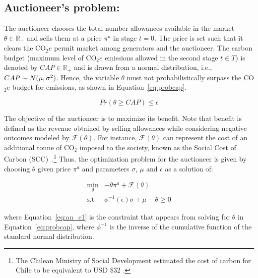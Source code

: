 \documentclass[11pt, letterpaper]{article}
\begin{document}
\subsection{Auctioneer's problem:}\label{sec:auctioneer}
 The auctioneer chooses the total number allowances available in the market $\theta\in \mathbb{R}_+$ and sells them at a price $\pi^a$ in stage $t=0$. The price is set such that it clears the CO$_2e$ permit market among generators and the auctioneer.  The carbon budget (maximum level of CO$_2e$ emissions allowed in the second stage $t\in T$) is denoted by  $CAP\in\mathbb{R}_+$ and is drawn from a normal distribution, i.e., $CAP \thicksim N(\mu, \sigma^2)$. Hence, the variable $\theta$ must not probabilistically surpass the CO$_2e$ budget for emissions, as shown in Equation~\ref{eq:probcap}.
 
\begin{equation}
    Pr(\theta \geq CAP) \leq \epsilon \label{eq:probcap}
\end{equation}

 The objective of the auctioneer is to maximize its benefit. Note that benefit is defined as the revenue obtained by selling allowances while considering negative outcomes modeled by $\mathcal{F}(\theta)$. For instance, $\mathcal{F}(\theta)$ can represent the cost of an additional tonne of CO$_2$ imposed to the society, known as the Social Cost of Carbon (SCC)~\cite{feijoo2014design}.\footnote{The Chilean Ministry of Social Development estimated the cost of carbon for Chile to be equivalent to USD \$32 \cite{ChileSCC}.} Thus, the optimization problem for the auctioneer is given by choosing $\theta$ given price $\pi^a$ and parameters $\sigma$, $\mu$ and $\epsilon$ as a solution of:

\begin{align}
    \min_{\theta} & -\theta \pi^{a}  + \mathcal{F}(\theta)   \label{eq:auc} \\
    \textrm{s.t \ } &  \phi^{-1}(\epsilon) \sigma + \mu - \theta  \geq 0 \label{eq:au_c1}
\end{align}

where Equation~\ref{eq:au_c1} is the constraint that appears from solving for $\theta$ in Equation~\ref{eq:probcap}, where $\phi^{-1}$ is the inverse of the cumulative function of the standard normal distribution. 

\end{document}
